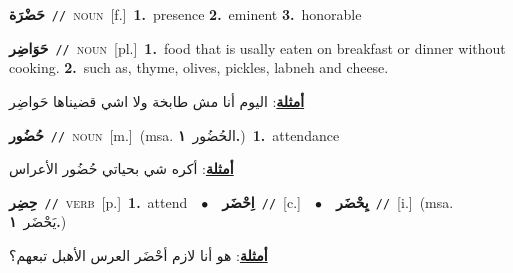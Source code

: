\documentclass[10pt,a4paper,twoside]{article} %
\begin{document}
\begin{multicols}{2}
{\setlength\topsep{0pt}\textbf{\foreignlanguage{arabic}{حَضْرَة}}\ {\color{gray}\texttt{//}\color{black}}\ \textsc{noun}\ [f.]\ \textbf{1.}~presence  \textbf{2.}~eminent  \textbf{3.}~honorable\ } \vspace{2mm}

{\setlength\topsep{0pt}\textbf{\foreignlanguage{arabic}{حَوَاضِر}}\ {\color{gray}\texttt{//}\color{black}}\ \textsc{noun}\ [pl.]\ \textbf{1.}~food that is usally eaten on breakfast or dinner without cooking.  \textbf{2.}~such as, thyme, olives, pickles, labneh and cheese.\  \begin{flushright}\color{gray}\foreignlanguage{arabic}{\textbf{\underline{\foreignlanguage{arabic}{أمثلة}}}: اليوم أنا مش طابخة ولا اشي قضيناها حَواضِر}\end{flushright}\color{black}} \vspace{2mm}

{\setlength\topsep{0pt}\textbf{\foreignlanguage{arabic}{حُضُور}}\ {\color{gray}\texttt{//}\color{black}}\ \textsc{noun}\ [m.]\ \color{gray}(msa. \foreignlanguage{arabic}{الحُضُور}~\foreignlanguage{arabic}{\textbf{١.}})\color{black}\ \textbf{1.}~attendance\  \begin{flushright}\color{gray}\foreignlanguage{arabic}{\textbf{\underline{\foreignlanguage{arabic}{أمثلة}}}: أكره شي بحياتي حُضُور الأعراس}\end{flushright}\color{black}} \vspace{2mm}

{\setlength\topsep{0pt}\textbf{\foreignlanguage{arabic}{حِضِر}}\ {\color{gray}\texttt{//}\color{black}}\ \textsc{verb}\ [p.]\ \textbf{1.}~attend\ \ $\bullet$\ \ \setlength\topsep{0pt}\textbf{\foreignlanguage{arabic}{اِحْضَر}}\ {\color{gray}\texttt{//}\color{black}}\ [c.]\ \ $\bullet$\ \ \setlength\topsep{0pt}\textbf{\foreignlanguage{arabic}{يِحْضَر}}\ {\color{gray}\texttt{//}\color{black}}\ [i.]\ \color{gray}(msa. \foreignlanguage{arabic}{يَحْضَر}~\foreignlanguage{arabic}{\textbf{١.}})\color{black}\  \begin{flushright}\color{gray}\foreignlanguage{arabic}{\textbf{\underline{\foreignlanguage{arabic}{أمثلة}}}: هو أنا لازم أحْضَر العرس الأهبل تبعهم؟}\end{flushright}\color{black}} \vspace{2mm}


\end{multicols}
\end{document}
